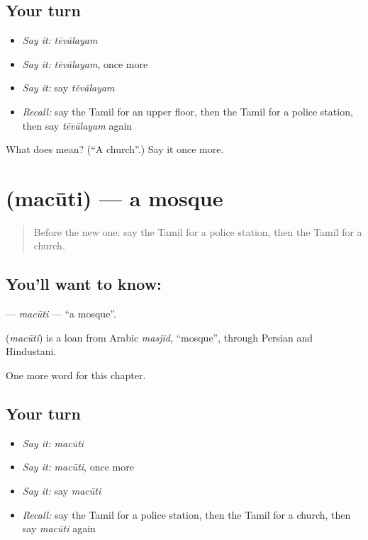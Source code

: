 \subsection*{Your turn}
\begin{itemize}
\raggedright
  \item \emph{Say it:} \emph{tēvālayam}
  \item \emph{Say it:} \emph{tēvālayam}, once more
  \item \emph{Say it:} say \emph{tēvālayam}
  \item \emph{Recall:} say the Tamil for an upper floor, then the Tamil for a police station, then say \emph{tēvālayam} again
\end{itemize}

\begin{tcolorbox}[breakable,colback=teal!4,colframe=teal!35!black,title={Before you move on}]
What does  mean? (\textquotedblleft{}A church\textquotedblright{}.) Say it once more.
\end{tcolorbox}
\section[\texorpdfstring{\ta{மசூதி} (macūti)}{மசூதி (macūti)}]{ (macūti) — a mosque}

\label{lesson:TA-C206-macuti}



\begin{quote}
Before the new one: say the Tamil for a police station, then the Tamil for a church.
\end{quote}

\subsection*{You'll want to know: }
\textbf{} — \emph{macūti} — \textquotedblleft{}a mosque\textquotedblright{}.

\begin{cousinweb}
\textbf{} (\emph{macūti}) is a loan from Arabic \emph{masjid}, \textquotedblleft{}mosque\textquotedblright{}, through Persian and Hindustani.
\end{cousinweb}

\begin{grammarlens}[title={What you've built}]
One more word for this chapter.
\end{grammarlens}

\subsection*{Your turn}
\begin{itemize}
\raggedright
  \item \emph{Say it:} \emph{macūti}
  \item \emph{Say it:} \emph{macūti}, once more
  \item \emph{Say it:} say \emph{macūti}
  \item \emph{Recall:} say the Tamil for a police station, then the Tamil for a church, then say \emph{macūti} again
\end{itemize}

